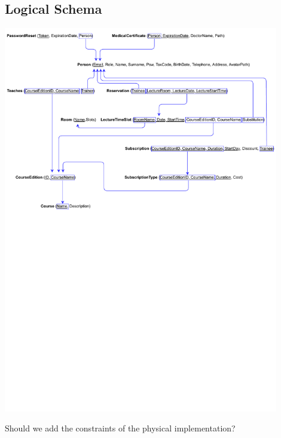 \subsection{Logical Schema}
    \begin{center}
		\includegraphics[width=0.9\textwidth,bb = 0 440 700 850,clip=true]{resources/Logical_Schema.pdf}
    \end{center}

	Should we add the constraints of the physical implementation?
    
	